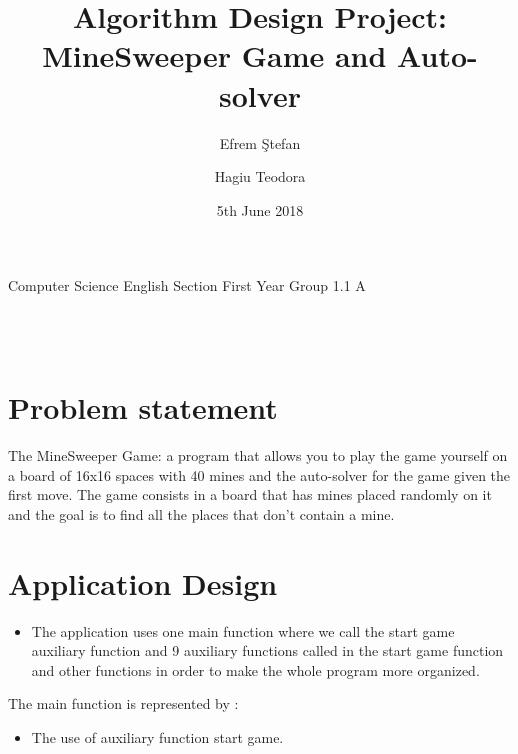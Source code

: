 \documentclass{article}
\begin{document}

\title{Algorithm Design Project: 
\newline
MineSweeper Game and Auto-solver}

\author{Efrem \c{S}tefan \and Hagiu Teodora}
\date {5th June 2018}
\maketitle
\item{Computer Science English Section First Year Group 1.1 A}

\begin{tabbing}
 \\
 \\

\end{tabbing}

\pagebreak


\section{Problem statement}
The MineSweeper Game: a program that allows you to play the game yourself on a board of 16x16 spaces with 40 mines and the auto-solver for the game given the first move. The game consists in a board that has mines placed randomly on it and the goal is to find all the places that don't contain a mine.

\linebreak


\section{Application Design}


\begin{itemize}
  \item The application uses one main function where we call the start game auxiliary function and 9 auxiliary functions called in the start game function and other functions in order to make the whole program more organized.
 
  \end{itemize}
  
  \item The main function is represented by :
  
  \begin{itemize}
  \item The use of auxiliary function start game.
  \end{itemize}
  
\end{document}
